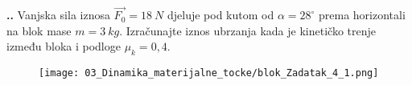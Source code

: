 

\noindent 
\textbf{
\thecjelina.\thezadatak.}
Vanjska sila iznosa $\vec{F_0}=18\ N$ djeluje pod kutom od $\alpha=28 ^\circ$ prema horizontali na blok mase $m=3\ kg$. Izračunajte iznos 
ubrzanja kada je kinetičko trenje između bloka i podloge $\mu_k=0,4$.


\begin{figure}[h]%
  \begin{center}
    \texttt{[image: 03\_Dinamika\_materijalne\_tocke/blok\_Zadatak\_4\_1.png]}
  \end{center}
\end{figure}
